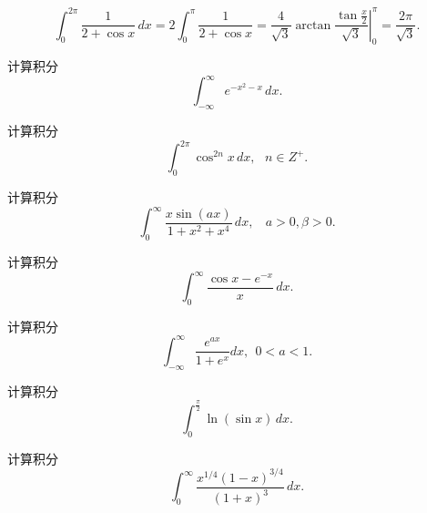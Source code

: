 \documentclass[CJK]{beamer}
\begin{document}
\begin{frame}
  \bch
  $$ \int_0^{2\pi}\frac{1}{2+\cos x} \, dx = 2\int_0^{\pi}\frac{1}{2+\cos x} =\left. \frac{4}{\sqrt{3}} \arctan\frac{\tan\frac{x}{2}}{\sqrt{3}}\right\vert_0^{\pi}  = \frac{2\pi}{\sqrt{3}} .$$
  \ech
\end{frame}



\begin{frame}
  \bch

  计算积分$$ \int_{-\infty}^\infty e^{-x^2-x} \, dx .$$
  \ech
\end{frame}

\begin{frame}
  \bch

  计算积分$$ \int_0^{2\pi} \cos^{2n}x\, dx,\ \ \ n \in Z^+. $$
  \ech
\end{frame}

\begin{frame}
  \bch
  计算积分$$\int_0^\infty \frac{x\sin{(ax)}}{1+x^2+x^4}\,dx, \ \ \ \ a>0, \beta>0.$$
  \ech
\end{frame}

\begin{frame}
  \bch
  计算积分$$ \int_0^{\infty} \frac{\cos{x} - e^{-x}}{x}\, dx.$$
  \ech
\end{frame}




\begin{frame}
  \bch

  计算积分$$\int_{-\infty}^\infty \frac{e^{ax}}{1+e^x} dx, \ \ 0<a<1.$$
  \ech
\end{frame}

\begin{frame}
  \bch
  计算积分$$ \int_0^{\frac{\pi}{2}}\ln\left(\sin x\right)\, dx.$$
  \ech
\end{frame}


\begin{frame}
  \bch
  计算积分$$ \int_0^{\infty} \frac{x^{1/4}(1-x)^{3/4}}{(1+x)^3}\, dx.$$
  \ech
\end{frame}
\end{document}
